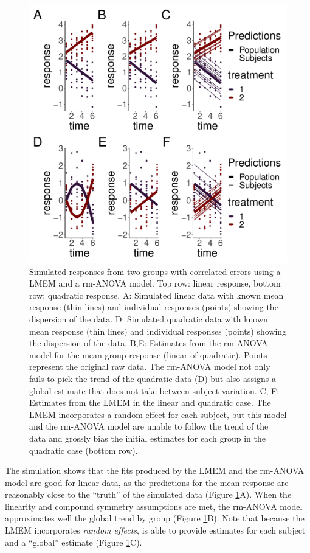 \documentclass[
]{article}
\begin{document}
\begin{figure}[H]

{\centering \includegraphics[width=0.75\linewidth,]{00-Full_document_files/figure-latex/l-q-response-1} 

}

\caption{Simulated responses from two groups with correlated errors using a LMEM and a rm-ANOVA model. Top row: linear response, bottom row: quadratic response. A: Simulated linear data with known mean response (thin lines) and individual responses (points) showing the dispersion of the data. D: Simulated quadratic data with known mean response (thin lines) and individual responses (points) showing the dispersion of the data. B,E: Estimates from the rm-ANOVA model for the mean group response (linear of quadratic). Points represent the original raw data. The rm-ANOVA model not only fails to pick the trend of the quadratic data (D) but also assigns a global estimate that does not take between-subject variation. C, F: Estimates from the LMEM in the linear and quadratic case. The LMEM incorporates a random effect for each subject, but this model and the rm-ANOVA model are unable to follow the trend of the data and grossly bias the initial estimates for each group in the quadratic case (bottom row).}\label{fig:l-q-response}
\end{figure}

The simulation shows that the fits produced by the LMEM and the rm-ANOVA model are good for linear data, as the predictions for the mean response are reasonably close to the ``truth'' of the simulated data (Figure \ref{fig:l-q-response}A). When the linearity and compound symmetry assumptions are met, the rm-ANOVA model approximates well the global trend by group (Figure \ref{fig:l-q-response}B). Note that because the LMEM incorporates \emph{random effects}, is able to provide estimates for each subject and a ``global'' estimate (Figure \ref{fig:l-q-response}C).
\end{document}
